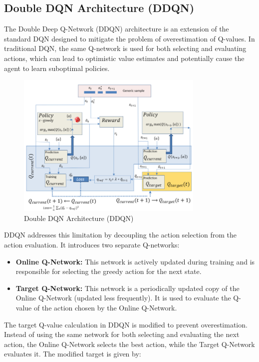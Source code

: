 \documentclass[12pt]{report}
\begin{document}
\subsection{Double DQN Architecture (DDQN)}

The Double Deep Q-Network (DDQN) architecture is an extension of the standard DQN designed to mitigate the problem of overestimation of Q-values. In traditional DQN, the same Q-network is used for both selecting and evaluating actions, which can lead to optimistic value estimates and potentially cause the agent to learn suboptimal policies.

\begin{figure}[htbp]
    \centering
    \includegraphics[width=0.8\textwidth]{images/ddqn-arch.png}
    \caption{Double DQN Architecture (DDQN)}
    \label{fig:ddqn-arch}
\end{figure}


DDQN addresses this limitation by decoupling the action selection from the action evaluation. It introduces two separate Q-networks:

\begin{itemize}
    \item \textbf{Online Q-Network:} This network is actively updated during training and is responsible for selecting the greedy action for the next state.
    
    \item \textbf{Target Q-Network:} This network is a periodically updated copy of the Online Q-Network (updated less frequently). It is used to evaluate the Q-value of the action chosen by the Online Q-Network.
\end{itemize}

The target Q-value calculation in DDQN is modified to prevent overestimation. Instead of using the same network for both selecting and evaluating the next action, the Online Q-Network selects the best action, while the Target Q-Network evaluates it. The modified target is given by:
\end{document}
